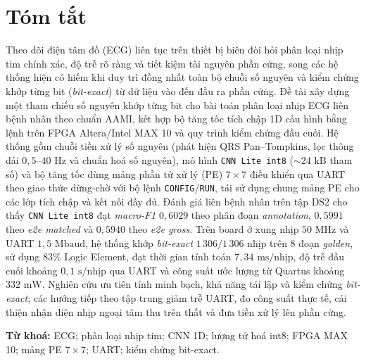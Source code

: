 \chapter*{Tóm tắt}

Theo dõi điện tâm đồ (ECG) liên tục trên thiết bị biên đòi hỏi phân loại nhịp tim chính xác, độ trễ rõ ràng và tiết kiệm tài nguyên phần cứng, song các hệ thống hiện có hiếm khi duy trì đồng nhất toàn bộ chuỗi số nguyên và kiểm chứng khớp từng bit (\emph{bit-exact}) từ dữ liệu vào đến đầu ra phần cứng. Đề tài xây dựng một tham chiếu số nguyên khớp từng bit cho bài toán phân loại nhịp ECG liên bệnh nhân theo chuẩn AAMI, kết hợp bộ tăng tốc tích chập 1D cấu hình bằng lệnh trên FPGA Altera/Intel MAX 10 và quy trình kiểm chứng đầu cuối. Hệ thống gồm chuỗi tiền xử lý số nguyên (phát hiện QRS Pan--Tompkins, lọc thông dải $0{,}5\text{--}40\text{ Hz}$ và chuẩn hoá số nguyên), mô hình \texttt{CNN Lite int8} ($\sim 24\text{ kB}$ tham số) và bộ tăng tốc dùng mảng phần tử xử lý (PE) $7\times 7$ điều khiển qua UART theo giao thức dừng-chờ với bộ lệnh \texttt{CONFIG}/\texttt{RUN}, tái sử dụng chung mảng PE cho các lớp tích chập và kết nối đầy đủ. Đánh giá liên bệnh nhân trên tập DS2 cho thấy \texttt{CNN Lite int8} đạt \emph{macro-F1} $0{,}6029$ theo phân đoạn \emph{annotation}, $0{,}5991$ theo \emph{e2e matched} và $0{,}5940$ theo \emph{e2e gross}. Trên board ở xung nhịp $50\text{ MHz}$ và UART $1{,}5\text{ Mbaud}$, hệ thống khớp \emph{bit-exact} $1\,306/1\,306$ nhịp trên 8 đoạn \emph{golden}, sử dụng $83\%$ Logic Element, đạt thời gian tính toán $7{,}34\text{ ms/nhịp}$, độ trễ đầu cuối khoảng $0{,}1\text{ s/nhịp}$ qua UART và công suất ước lượng từ Quartus khoảng $332\text{ mW}$. Nghiên cứu ưu tiên tính minh bạch, khả năng tái lập và kiểm chứng \emph{bit-exact}; các hướng tiếp theo tập trung giảm trễ UART, đo công suất thực tế, cải thiện nhận diện nhịp ngoại tâm thu trên thất và đưa tiền xử lý lên phần cứng.

\medskip
\noindent\textbf{Từ khoá:} ECG; phân loại nhịp tim; CNN 1D; lượng tử hoá int8; FPGA MAX 10; mảng PE $7\times 7$; UART; kiểm chứng bit-exact.
